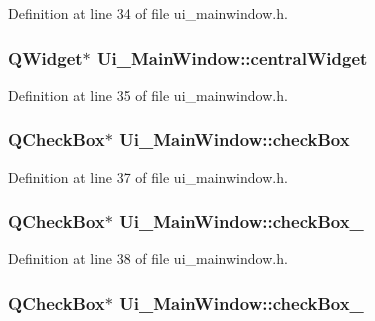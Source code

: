 Definition at line 34 of file ui\-\_\-mainwindow.\-h.

\hypertarget{class_ui___main_window_a30075506c2116c3ed4ff25e07ae75f81}{
\subsubsection[{central\-Widget}]{\setlength{\rightskip}{0pt plus 5cm}Q\-Widget$\ast$ Ui\-\_\-\-Main\-Window\-::central\-Widget}}\label{class_ui___main_window_a30075506c2116c3ed4ff25e07ae75f81}


Definition at line 35 of file ui\-\_\-mainwindow.\-h.

\hypertarget{class_ui___main_window_ae8154204ed56489a091cf3a81af1f996}{
\subsubsection[{check\-Box}]{\setlength{\rightskip}{0pt plus 5cm}Q\-Check\-Box$\ast$ Ui\-\_\-\-Main\-Window\-::check\-Box}}\label{class_ui___main_window_ae8154204ed56489a091cf3a81af1f996}


Definition at line 37 of file ui\-\_\-mainwindow.\-h.

\hypertarget{class_ui___main_window_a42f54d4275ffecc52ea117a43a2a4def}{
\subsubsection[{check\-Box\-\_\-2}]{\setlength{\rightskip}{0pt plus 5cm}Q\-Check\-Box$\ast$ Ui\-\_\-\-Main\-Window\-::check\-Box\-\_}}\label{class_ui___main_window_a42f54d4275ffecc52ea117a43a2a4def}


Definition at line 38 of file ui\-\_\-mainwindow.\-h.

\hypertarget{class_ui___main_window_a7a0d575eebed36eac1592982b62ea449}{
\subsubsection[{check\-Box\-\_\-3}]{\setlength{\rightskip}{0pt plus 5cm}Q\-Check\-Box$\ast$ Ui\-\_\-\-Main\-Window\-::check\-Box\-\_}}\label{class_ui___main_window_a7a0d575eebed36eac1592982b62ea449}


